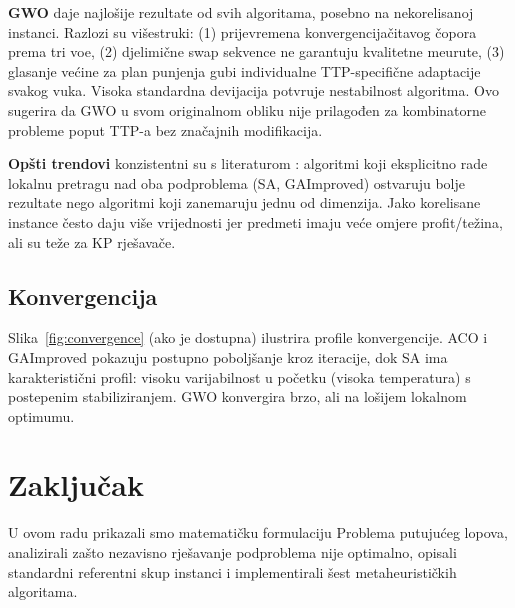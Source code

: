 \documentclass[12pt,a4paper]{article}
\begin{document}
\textbf{GWO} daje najlo\v{s}ije rezultate od svih algoritama, posebno na nekorelisanoj instanci. Razlozi su vi\v{s}estruki: (1) prijevremena konvergencija\v{c}itavog \v{c}opora prema tri vo\dj{}e, (2) djelimi\v{c}ne swap sekvence ne garantuju kvalitetne me\dj{}urute, (3) glasanje ve\'{c}ine za plan punjenja gubi individualne TTP-specifi\v{c}ne adaptacije svakog vuka. Visoka standardna devijacija potvr\dj{}uje nestabilnost algoritma. Ovo sugerira da GWO u svom originalnom obliku nije prilagođen za kombinatorne probleme poput TTP-a bez zna\v{c}ajnih modifikacija.

\textbf{Opšti trendovi} konzistentni su s literaturom \cite{wagner_selection}: algoritmi koji eksplicitno rade lokalnu pretragu nad oba podproblema (SA, GAImproved) ostvaruju bolje rezultate nego algoritmi koji zanemaruju jednu od dimenzija. Jako korelisane instance \v{c}esto daju vi\v{s}e vrijednosti jer predmeti imaju ve\'{c}e omjere profit/te\v{z}ina, ali su te\v{z}e za KP rje\v{s}ava\v{c}e.

\subsection{Konvergencija}

Slika~\ref{fig:convergence} (ako je dostupna) ilustrira profile konvergencije. ACO i GAImproved pokazuju postupno pobolj\v{s}anje kroz iteracije, dok SA ima karakteristi\v{c}ni profil: visoku varijabilnost u po\v{c}etku (visoka temperatura) s postepenim stabiliziranjem. GWO konvergira brzo, ali na lo\v{s}ijem lokalnom optimumu.

\section{Zaklju\v{c}ak}

U ovom radu prikazali smo matematičku formulaciju Problema putuju\'{c}eg lopova, analizirali zašto nezavisno rje\v{s}avanje podproblema nije optimalno, opisali standardni referentni skup instanci i implementirali \v{s}est metaheuristi\v{c}kih algoritama.
\end{document}

